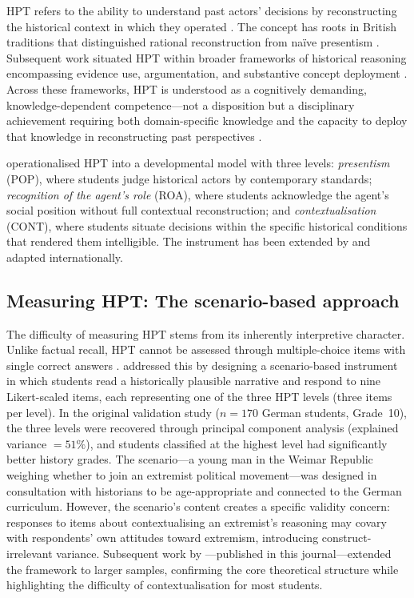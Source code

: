 \documentclass[pdflatex,sn-apa]{sn-jnl}%
\begin{document}
HPT refers to the ability to understand past actors' decisions by reconstructing the historical context in which they operated \citep{Lee2001, Hartmann2008}. The concept has roots in British traditions that distinguished rational reconstruction from na\"ive presentism \citep{Ashby1987, Lee2001}. Subsequent work situated HPT within broader frameworks of historical reasoning encompassing evidence use, argumentation, and substantive concept deployment \citep{VanBoxtel2018, vanDrie2007}. Across these frameworks, HPT is understood as a cognitively demanding, knowledge-dependent competence---not a disposition but a disciplinary achievement requiring both domain-specific knowledge and the capacity to deploy that knowledge in reconstructing past perspectives \citep{Chapman2021, Wineburg2001}.

\citet{Hartmann2008} operationalised HPT into a developmental model with three levels: \emph{presentism} (POP), where students judge historical actors by contemporary standards; \emph{recognition of the agent's role} (ROA), where students acknowledge the agent's social position without full contextual reconstruction; and \emph{contextualisation} (CONT), where students situate decisions within the specific historical conditions that rendered them intelligible. The instrument has been extended by \citet{Huijgen2014, Huijgen2017} and adapted internationally.

\subsection{Measuring HPT: The scenario-based approach}\label{subsec:measuring}

The difficulty of measuring HPT stems from its inherently interpretive character. Unlike factual recall, HPT cannot be assessed through multiple-choice items with single correct answers \citep{Smith2017}. \citet{Hartmann2008} addressed this by designing a scenario-based instrument in which students read a historically plausible narrative and respond to nine Likert-scaled items, each representing one of the three HPT levels (three items per level). In the original validation study ($n = 170$ German students, Grade~10), the three levels were recovered through principal component analysis (explained variance $= 51\%$), and students classified at the highest level had significantly better history grades. The scenario---a young man in the Weimar Republic weighing whether to join an extremist political movement---was designed in consultation with historians to be age-appropriate and connected to the German curriculum. However, the scenario's content creates a specific validity concern: responses to items about contextualising an extremist's reasoning may covary with respondents' own attitudes toward extremism, introducing construct-irrelevant variance. Subsequent work by \citet{Huijgen2014}---published in this journal---extended the framework to larger samples, confirming the core theoretical structure while highlighting the difficulty of contextualisation for most students.
\end{document}
